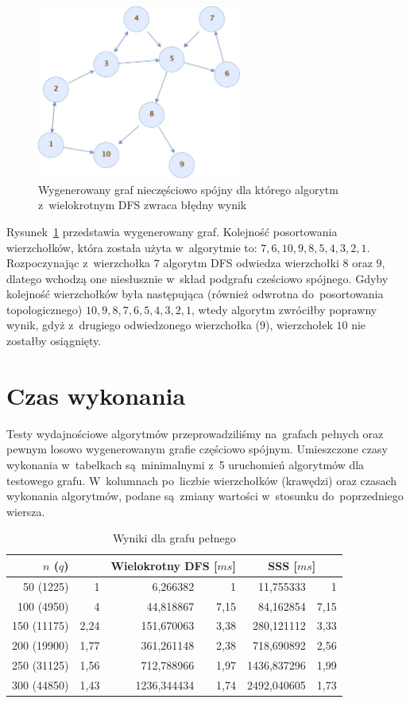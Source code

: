 \documentclass[a4paper,12pt]{mwart}
\begin{document}
\begin{figure}[htpb]
\centering
\includegraphics[width=0.6\textwidth]{generated-tricky-graph.jpg}
\caption{Wygenerowany graf nieczęściowo spójny dla którego algorytm
  z~wielokrotnym DFS zwraca błędny wynik}
\label{fig:tricky-graph}
\end{figure}

Rysunek~\ref{fig:tricky-graph} przedstawia wygenerowany graf. Kolejność
posortowania wierzchołków, która została użyta w~algorytmie to:
$7, 6, 10, 9, 8, 5, 4, 3, 2, 1$. Rozpoczynając z~wierzchołka $7$ algorytm DFS
odwiedza wierzchołki $8$ oraz $9$, dlatego wchodzą one niesłusznie w~skład
podgrafu cześciowo spójnego. Gdyby kolejność wierzchołków była następująca
(również odwrotna do~posortowania topologicznego)
$10, 9, 8, 7, 6, 5, 4, 3, 2, 1$, wtedy algorytm zwróciłby poprawny wynik, gdyż
z~drugiego odwiedzonego wierzchołka ($9$), wierzchołek $10$ nie zostałby
osiągnięty.

\section{Czas wykonania}

Testy wydajnościowe algorytmów przeprowadziliśmy na~grafach pełnych oraz pewnym
losowo wygenerowanym grafie częściowo spójnym. Umieszczone czasy wykonania
w~tabelkach są~minimalnymi z~5 uruchomień algorytmów dla testowego grafu.
W~kolumnach po~liczbie wierzchołków (krawędzi) oraz czasach wykonania
algorytmów, podane są~zmiany wartości w~stosunku do~poprzedniego wiersza.

\begin{table}[H]
  \centering
  \begin{tabular}{ r r r r r r }
    \multicolumn{2}{c}{$n$ ($q$)} & \multicolumn{2}{c}{Wielokrotny DFS [$ms$]} & \multicolumn{2}{c}{SSS [$ms$]} \\
    \hline
    50 (1225) & 1 & 6,266382 & 1 & 11,755333 & 1 \\
    100 (4950) & 4 & 44,818867 & 7,15 & 84,162854 & 7,15 \\
    150 (11175) & 2,24 & 151,670063 & 3,38 & 280,121112 & 3,33 \\
    200 (19900) & 1,77 & 361,261148 & 2,38 & 718,690892 & 2,56 \\
    250 (31125) & 1,56 & 712,788966 & 1,97 & 1436,837296 & 1,99 \\
    300 (44850) & 1,43 & 1236,344434 & 1,74 & 2492,040605 & 1,73 \\
  \end{tabular}
  \caption{Wyniki dla grafu pełnego}
\end{table}
\end{document}
